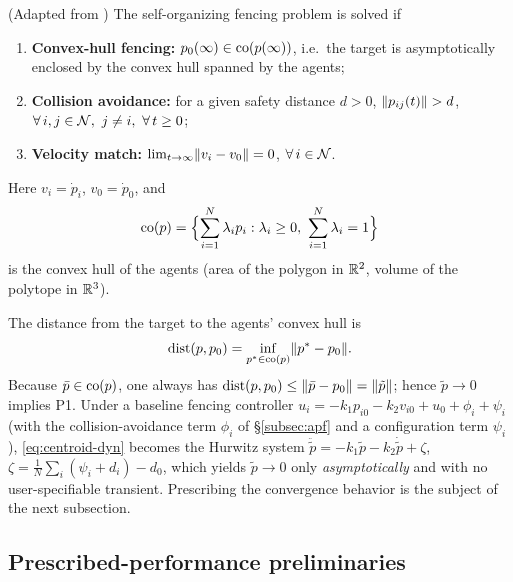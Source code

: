 \begin{definition}
    (Adapted from \cite{chenCooperativeTargetfencingProtocol2019})
    The self-organizing fencing problem is solved if
    \begin{enumerate}
        \item[\textbf{P1}] \textbf{Convex-hull fencing:}
        $p_0(\infty)\in \mathrm{co}(p(\infty))$, i.e.\ the target is asymptotically
        enclosed by the convex hull spanned by the agents;
        \item[\textbf{P2}] \textbf{Collision avoidance:}
        for a given safety distance $d>0$,
        $\lVert p_{ij}(t) \rVert > d$, $\forall\, i,j\in\mathcal{N},\ j\neq i,\ \forall\, t\ge 0$;
        \item[\textbf{P3}] \textbf{Velocity match:}
        $\lim_{t\to\infty}\lVert v_i-v_0 \rVert=0$, $\forall\, i\in\mathcal{N}$.
    \end{enumerate}
    Here $v_i=\dot p_i$, $v_0=\dot p_0$, and
    \[
    \mathrm{co}(p) = \Bigl\{ \sum_{i=1}^N \lambda_i p_i
    : \lambda_i \ge 0,\ \sum_{i=1}^N \lambda_i = 1 \Bigr\}
    \]
    is the convex hull of the agents (area of the polygon in $\mathbb{R}^2$,
    volume of the polytope in $\mathbb{R}^3$).
\end{definition}

The distance from the target to the agents' convex hull is
\begin{equation}
    \mathrm{dist}(p,p_0)=\inf_{p^*\in\mathrm{co}(p)}\lVert p^*-p_0 \rVert.
    \label{eq:dist}
\end{equation}
Because $\bar p\in\mathrm{co}(p)$, one always has
$\mathrm{dist}(p,p_0)\le \lVert \bar p-p_0 \rVert=\lVert \tilde p \rVert$; hence
$\tilde p\to 0$ implies P1. Under a baseline fencing controller
$u_i=-k_1 p_{i0}-k_2 v_{i0}+u_0+\phi_i+\psi_i$ (with the collision-avoidance
term $\phi_i$ of \S\ref{subsec:apf} and a configuration term $\psi_i$),
\eqref{eq:centroid-dyn} becomes the Hurwitz system
$\ddot{\tilde p}=-k_1\tilde p-k_2\dot{\tilde p}+\zeta$,
$\zeta=\frac1N\sum_i(\psi_i+d_i)-d_0$, which yields
$\tilde p\to 0$ only \emph{asymptotically} and with no user-specifiable
transient. Prescribing the convergence behavior is the subject of the next
subsection.

\subsection{Prescribed-performance preliminaries}
\label{subsec:ppc}


